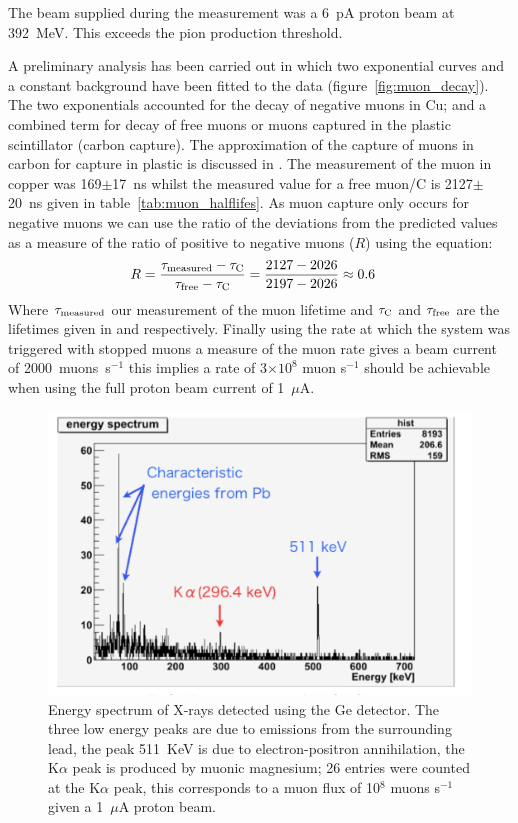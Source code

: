 \documentclass[a4paper]{jpconf}
\begin{document}
The beam supplied during the measurement was a 6~pA proton beam at 392~MeV. This exceeds the pion production threshold.

A preliminary analysis has been carried out in which two exponential curves and a constant background have been fitted to the data (figure~\ref{fig:muon_decay}). The two exponentials accounted for the decay of negative muons in Cu; and a combined term for decay of free muons or muons captured in the plastic scintillator (carbon capture). The approximation of the capture of muons in carbon for capture in plastic is discussed in \cite{Suzuki1987muonCapture}. The measurement of the muon in copper was 169$\pm$17~ns whilst the measured value for a free muon/C is 2127$\pm$20~ns given in table~\ref{tab:muon_halflifes}. As muon capture only occurs for negative muons we can use the ratio of the deviations from the predicted values as a measure of the ratio of positive to negative muons ($R$) using the equation:
\begin{eqnarray}
    R &= \frac{\tau_{\rm{measured}} - \tau_{\rm{C}}}{\tau_{\rm{free}} - \tau_{\rm{C}} } = \frac{2127 - 2026}{2197-2026} \approx 0.6  \label{equ:ratio_pos_neg}
\end{eqnarray}
Where $\tau_{\rm{measured}}$ our measurement of the muon lifetime and $\tau_{\rm{C}}$ and $\tau_{\rm{free}}$ are the lifetimes given in \cite{Suzuki1987muonCapture} and \cite{Pdg2010} respectively. Finally using the rate at which the system was triggered with stopped muons a measure of the muon rate gives a beam current of 2000~muons~s$^{-1}$ this implies a rate of 3$\times 10^8$ muon s$^{-1}$ should be achievable when using the full proton beam current of 1~$\mu$A. 

\begin{figure}[htbp]
    \centering
        \includegraphics[height=7.5cm]{images/muonic_xray_spectrum.png}
    \caption{Energy spectrum of X-rays detected using the Ge detector. The three low energy peaks are due to emissions from the surrounding lead, the peak 511~KeV is due to electron-positron annihilation, the K$\alpha$ peak is produced by muonic magnesium; 26 entries were counted at the K$\alpha$ peak, this corresponds to a muon flux of 10$^8$ muons s$^{-1}$ given a 1~$\mu$A proton beam.}
    \label{fig:muonic_xray_spectrum}
\end{figure}
\end{document}
